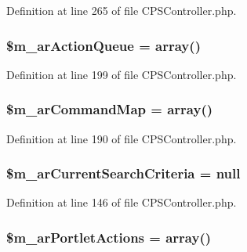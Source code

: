 Definition at line 265 of file CPSController.php.

\hypertarget{classCPSController_a38c24de57d837a560704c7d6aa27526b}{
\subsubsection[{\$m\_\-arActionQueue}]{\setlength{\rightskip}{0pt plus 5cm}\$m\_\-arActionQueue = {\bf array}()}}
\label{classCPSController_a38c24de57d837a560704c7d6aa27526b}


Definition at line 199 of file CPSController.php.

\hypertarget{classCPSController_a8a9ecdbe8dd0813218e90b2e4642900b}{
\subsubsection[{\$m\_\-arCommandMap}]{\setlength{\rightskip}{0pt plus 5cm}\$m\_\-arCommandMap = {\bf array}()}}
\label{classCPSController_a8a9ecdbe8dd0813218e90b2e4642900b}


Definition at line 190 of file CPSController.php.

\hypertarget{classCPSController_ad84b172fc8b07205968983aa7ead7f56}{
\subsubsection[{\$m\_\-arCurrentSearchCriteria}]{\setlength{\rightskip}{0pt plus 5cm}\$m\_\-arCurrentSearchCriteria = null}}
\label{classCPSController_ad84b172fc8b07205968983aa7ead7f56}


Definition at line 146 of file CPSController.php.

\hypertarget{classCPSController_a3c4633512ae87d3b845b59d4514115d5}{
\subsubsection[{\$m\_\-arPortletActions}]{\setlength{\rightskip}{0pt plus 5cm}\$m\_\-arPortletActions = {\bf array}()}}
\label{classCPSController_a3c4633512ae87d3b845b59d4514115d5}


